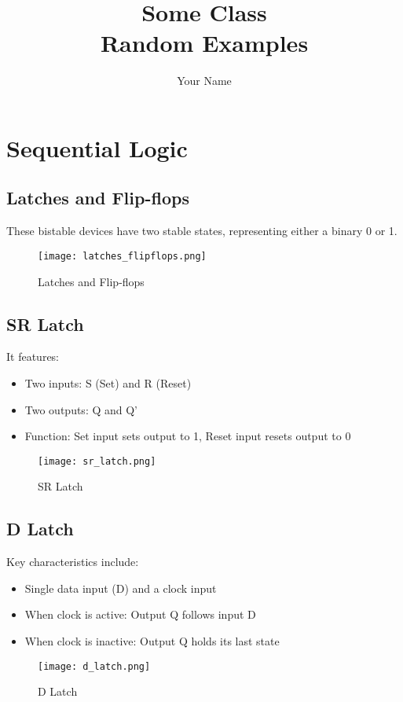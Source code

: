 \documentclass[12pt]{report}
\title{\Huge{Some Class}\\Random Examples}
\author{\huge{Your Name}}
\date{}
\begin{document}
\chapter{Sequential Logic}
\section{Latches and Flip-flops}
These bistable devices have two stable states, representing either a binary 0 or 1.
\begin{figure}[H]
    \centering
    \texttt{[image: latches\_flipflops.png]}
    \caption{Latches and Flip-flops}
\end{figure}

\section{SR Latch}
 It features:
\begin{itemize}
    \item Two inputs: S (Set) and R (Reset)
    \item Two outputs: Q and Q'
    \item Function: Set input sets output to 1, Reset input resets output to 0
\end{itemize}
\begin{figure}[H]
    \centering
    \texttt{[image: sr\_latch.png]}
    \caption{SR Latch}
\end{figure}

\section{D Latch}
 Key characteristics include:
\begin{itemize}
    \item Single data input (D) and a clock input
    \item When clock is active: Output Q follows input D
    \item When clock is inactive: Output Q holds its last state
\end{itemize}
\begin{figure}[H]
    \centering
    \texttt{[image: d\_latch.png]}
    \caption{D Latch}
\end{figure}
\end{document}
